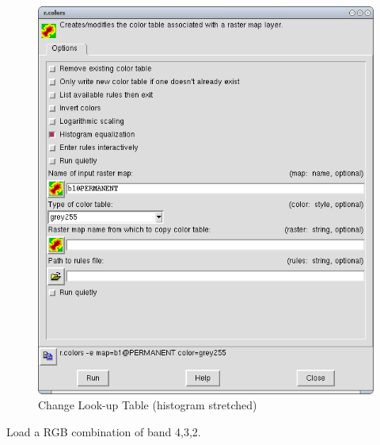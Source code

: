 \begin{figure}[htbp]
   \centering
   \includegraphics[scale=0.35]{grass_rs003.png}
   \caption{Change Look-up Table (histogram stretched)}
   \label{fig:grass_rs003}
\end{figure}

Load a RGB combination of band 4,3,2.

